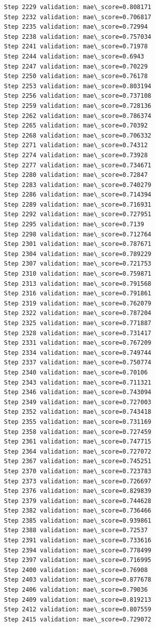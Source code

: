 \documentclass[11pt]{article}
\begin{document}
\begin{Verbatim}[commandchars=\\\{\}]
Step 2229 validation: mae\_score=0.808171
Step 2232 validation: mae\_score=0.706817
Step 2235 validation: mae\_score=0.72994
Step 2238 validation: mae\_score=0.757034
Step 2241 validation: mae\_score=0.71978
Step 2244 validation: mae\_score=0.6943
Step 2247 validation: mae\_score=0.70229
Step 2250 validation: mae\_score=0.76178
Step 2253 validation: mae\_score=0.803194
Step 2256 validation: mae\_score=0.737108
Step 2259 validation: mae\_score=0.728136
Step 2262 validation: mae\_score=0.786374
Step 2265 validation: mae\_score=0.70392
Step 2268 validation: mae\_score=0.706332
Step 2271 validation: mae\_score=0.74312
Step 2274 validation: mae\_score=0.73928
Step 2277 validation: mae\_score=0.734671
Step 2280 validation: mae\_score=0.72847
Step 2283 validation: mae\_score=0.740279
Step 2286 validation: mae\_score=0.714394
Step 2289 validation: mae\_score=0.716931
Step 2292 validation: mae\_score=0.727951
Step 2295 validation: mae\_score=0.7139
Step 2298 validation: mae\_score=0.712764
Step 2301 validation: mae\_score=0.787671
Step 2304 validation: mae\_score=0.789229
Step 2307 validation: mae\_score=0.721753
Step 2310 validation: mae\_score=0.759871
Step 2313 validation: mae\_score=0.791568
Step 2316 validation: mae\_score=0.791861
Step 2319 validation: mae\_score=0.762079
Step 2322 validation: mae\_score=0.787204
Step 2325 validation: mae\_score=0.771887
Step 2328 validation: mae\_score=0.731417
Step 2331 validation: mae\_score=0.767209
Step 2334 validation: mae\_score=0.749744
Step 2337 validation: mae\_score=0.750774
Step 2340 validation: mae\_score=0.70106
Step 2343 validation: mae\_score=0.711321
Step 2346 validation: mae\_score=0.743094
Step 2349 validation: mae\_score=0.727003
Step 2352 validation: mae\_score=0.743418
Step 2355 validation: mae\_score=0.731169
Step 2358 validation: mae\_score=0.727459
Step 2361 validation: mae\_score=0.747715
Step 2364 validation: mae\_score=0.727072
Step 2367 validation: mae\_score=0.745251
Step 2370 validation: mae\_score=0.723783
Step 2373 validation: mae\_score=0.726697
Step 2376 validation: mae\_score=0.829839
Step 2379 validation: mae\_score=0.744628
Step 2382 validation: mae\_score=0.736466
Step 2385 validation: mae\_score=0.939861
Step 2388 validation: mae\_score=0.72537
Step 2391 validation: mae\_score=0.733616
Step 2394 validation: mae\_score=0.778499
Step 2397 validation: mae\_score=0.716995
Step 2400 validation: mae\_score=0.76908
Step 2403 validation: mae\_score=0.877678
Step 2406 validation: mae\_score=0.79036
Step 2409 validation: mae\_score=0.819213
Step 2412 validation: mae\_score=0.807559
Step 2415 validation: mae\_score=0.729072

\end{Verbatim}
\end{document}
